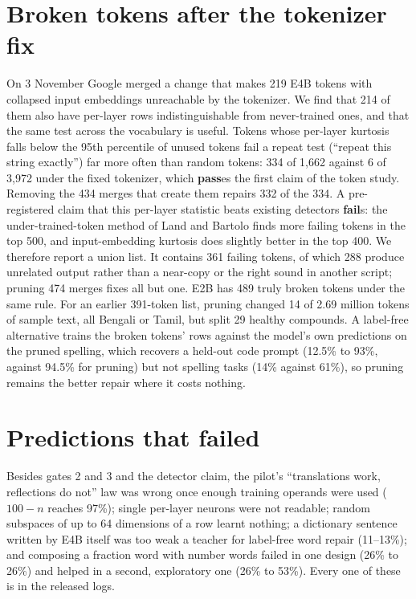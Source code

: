 \documentclass[10pt]{article}
\newcommand{\PASS}{\textcolor{pass}{\textbf{pass}}}\newcommand{\FAIL}{\textcolor{fail}{\textbf{fail}}}
\begin{document}
\section{Broken tokens after the tokenizer fix}\label{sec:tokens}
On 3 November Google merged a change that makes 219 E4B tokens with collapsed input embeddings unreachable by the tokenizer. We find that 214 of them also have per-layer rows indistinguishable from never-trained ones, and that the same test across the vocabulary is useful. Tokens whose per-layer kurtosis falls below the 95th percentile of unused tokens fail a repeat test (``repeat this string exactly'') far more often than random tokens: 334 of 1{,}662 against 6 of 3{,}972 under the fixed tokenizer, which \PASS{}es the first claim of the token study. Removing the 434 merges that create them repairs 332 of the 334. A pre-registered claim that this per-layer statistic beats existing detectors \FAIL{}s: the under-trained-token method of Land and Bartolo finds more failing tokens in the top 500, and input-embedding kurtosis does slightly better in the top 400. We therefore report a union list. It contains 361 failing tokens, of which 288 produce unrelated output rather than a near-copy or the right sound in another script; pruning 474 merges fixes all but one. E2B has 489 truly broken tokens under the same rule. For an earlier 391-token list, pruning changed 14 of 2.69 million tokens of sample text, all Bengali or Tamil, but split 29 healthy compounds. A label-free alternative trains the broken tokens' rows against the model's own predictions on the pruned spelling, which recovers a held-out code prompt (12.5\% to 93\%, against 94.5\% for pruning) but not spelling tasks (14\% against 61\%), so pruning remains the better repair where it costs nothing.

\section{Predictions that failed}
Besides gates 2 and 3 and the detector claim, the pilot's ``translations work, reflections do not'' law was wrong once enough training operands were used ($100-n$ reaches 97\%); single per-layer neurons were not readable; random subspaces of up to 64 dimensions of a row learnt nothing; a dictionary sentence written by E4B itself was too weak a teacher for label-free word repair (11--13\%); and composing a fraction word with number words failed in one design (26\% to 26\%) and helped in a second, exploratory one (26\% to 53\%). Every one of these is in the released logs.
\end{document}
